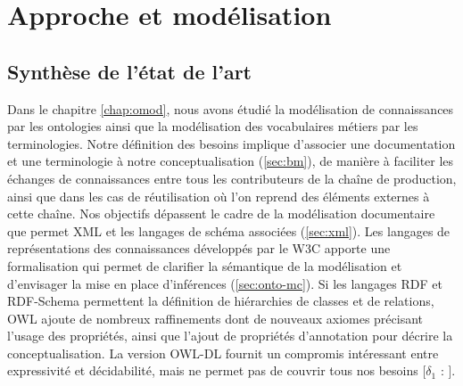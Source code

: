 \chapter{Approche et modélisation}\label{chap:mod}
\minitoc





\section{Synthèse de l'état de l'art}\label{sec:principes}
Dans le chapitre \ref{chap:omod}, nous avons étudié la modélisation de connaissances par les ontologies ainsi que la modélisation des vocabulaires métiers par les terminologies. 
Notre définition des besoins implique d'associer une documentation et une terminologie à notre conceptualisation (\ref{sec:bm}), de manière à faciliter les échanges de connaissances entre tous les contributeurs de la chaîne de production, ainsi que dans les cas de réutilisation où l'on reprend des éléments externes à cette chaîne.
Nos objectifs dépassent le cadre de la modélisation documentaire que permet XML et les langages de schéma associées (\ref{sec:xml}).
Les langages de représentations des connaissances développés par le W3C apporte une formalisation qui permet de clarifier la sémantique de la modélisation et d'envisager la mise en place d'inférences (\ref{sec:onto-mc}).
Si les langages RDF et RDF-Schema permettent la définition de hiérarchies de classes et de relations, OWL ajoute de nombreux raffinements dont de nouveaux axiomes précisant l'usage des propriétés, ainsi que l'ajout de propriétés d'annotation pour décrire la conceptualisation.
La version OWL-DL fournit un compromis intéressant entre expressivité et décidabilité, mais ne permet pas de couvrir tous nos besoins [$\delta_1$ : ].

